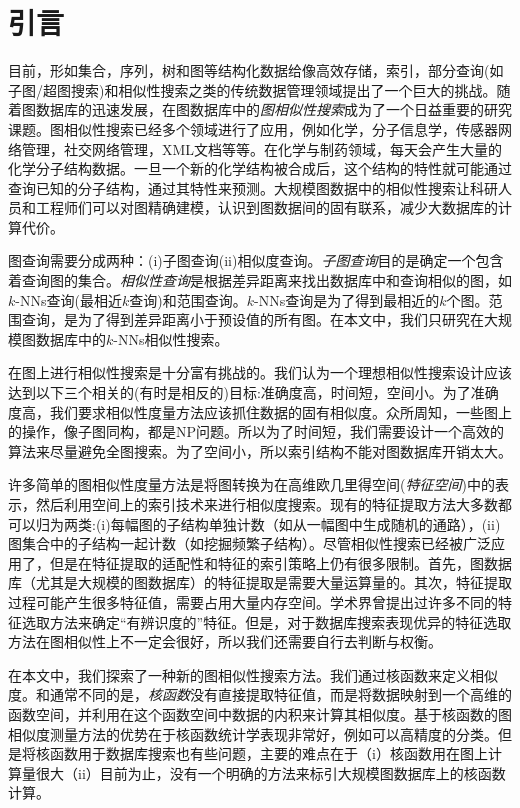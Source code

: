 \documentclass{article}
\begin{document}
\else

\fi
\section{引言}
目前，形如集合，序列，树和图等结构化数据给像高效存储，索引，部分查询(如子图/超图搜索)和相似性搜索之类的传统数据管理领域提出了一个巨大的挑战。随着图数据库的迅速发展，在图数据库中的\emph{图相似性搜索}成为了一个日益重要的研究课题。图相似性搜索已经多个领域进行了应用，例如化学，分子信息学，传感器网络管理，社交网络管理，XML文档等等。在化学与制药领域，每天会产生大量的化学分子结构数据。一旦一个新的化学结构被合成后，这个结构的特性就可能通过查询已知的分子结构，通过其特性来预测。大规模图数据中的相似性搜索让科研人员和工程师们可以对图精确建模，认识到图数据间的固有联系，减少大数据库的计算代价。

图查询需要分成两种：(i)子图查询(ii)相似度查询。\emph{子图查询}目的是确定一个包含着查询图的集合。\emph{相似性查询}是根据差异距离来找出数据库中和查询相似的图，如$k$-NNs查询(最相近$k$查询)和范围查询。$k$-NNs查询是为了得到最相近的$k$个图。范围查询，是为了得到差异距离小于预设值的所有图。在本文中，我们只研究在大规模图数据库中的$k$-NNs相似性搜索。

在图上进行相似性搜索是十分富有挑战的。我们认为一个理想相似性搜索设计应该达到以下三个相关的(有时是相反的)目标:准确度高，时间短，空间小。为了准确度高，我们要求相似性度量方法应该抓住数据的固有相似度。众所周知，一些图上的操作，像子图同构，都是NP问题。所以为了时间短，我们需要设计一个高效的算法来尽量避免全图搜索。为了空间小，所以索引结构不能对图数据库开销太大。

许多简单的图相似性度量方法是将图转换为在高维欧几里得空间(\emph{特征空间})中的表示，然后利用空间上的索引技术来进行相似度搜索。现有的特征提取方法大多数都可以归为两类:(i)每幅图的子结构单独计数（如从一幅图中生成随机的通路），(ii)图集合中的子结构一起计数（如挖掘频繁子结构）。尽管相似性搜索已经被广泛应用了，但是在特征提取的适配性和特征的索引策略上仍有很多限制。首先，图数据库（尤其是大规模的图数据库）的特征提取是需要大量运算量的。其次，特征提取过程可能产生很多特征值，需要占用大量内存空间。学术界曾提出过许多不同的特征选取方法来确定“有辨识度的”特征。但是，对于数据库搜索表现优异的特征选取方法在图相似性上不一定会很好，所以我们还需要自行去判断与权衡。

在本文中，我们探索了一种新的图相似性搜索方法。我们通过核函数来定义相似度。和通常不同的是，\emph{核函数}没有直接提取特征值，而是将数据映射到一个高维的函数空间，并利用在这个函数空间中数据的内积来计算其相似度。基于核函数的图相似度测量方法的优势在于核函数统计学表现非常好，例如可以高精度的分类。但是将核函数用于数据库搜索也有些问题，主要的难点在于（i）核函数用在图上计算量很大（ii）目前为止，没有一个明确的方法来标引大规模图数据库上的核函数计算。
\end{document}

